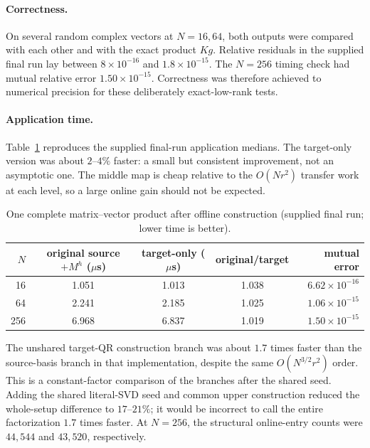 \documentclass[11pt]{article}
\begin{document}
\paragraph{Correctness.}  On several random complex vectors at $N=16,64$, both outputs were compared with each other and with the exact product $Kg$.  Relative residuals in the supplied final run lay between $8\times10^{-16}$ and $1.8\times10^{-15}$.  The $N=256$ timing check had mutual relative error $1.50\times10^{-15}$.  Correctness was therefore achieved to numerical precision for these deliberately exact-low-rank tests.

\paragraph{Application time.}  Table~\ref{tab:timings} reproduces the supplied final-run application medians.  The target-only version was about $2$--$4\%$ faster: a small but consistent improvement, not an asymptotic one.  The middle map is cheap relative to the $O(Nr^2)$ transfer work at each level, so a large online gain should not be expected.

\begin{table}[htbp]
\centering
\caption{One complete matrix--vector product after offline construction (supplied final run; lower time is better).}
\label{tab:timings}
\begin{tabular}{rcccr}
\toprule
$N$ & original source $+M^h$ ($\mu$s) & target-only ($\mu$s) & original/target & mutual error\\
\midrule
16  & 1.051 & 1.013 & 1.038 & $6.62\times10^{-16}$\\
64  & 2.241 & 2.185 & 1.025 & $1.06\times10^{-15}$\\
256 & 6.968 & 6.837 & 1.019 & $1.50\times10^{-15}$\\
\bottomrule
\end{tabular}
\end{table}

The unshared target-QR construction branch was about $1.7$ times faster than the source-basis branch in that implementation, despite the same $O(N^{3/2}r^2)$ order.  This is a constant-factor comparison of the branches after the shared seed.  Adding the shared literal-SVD seed and common upper construction reduced the whole-setup difference to $17$--$21\%$; it would be incorrect to call the entire factorization $1.7$ times faster.  At $N=256$, the structural online-entry counts were $44{,}544$ and $43{,}520$, respectively.
\end{document}
